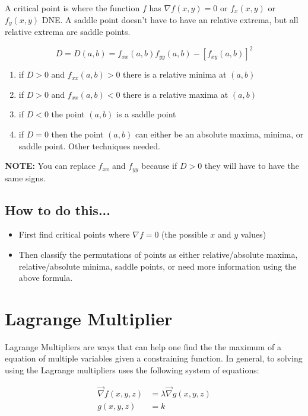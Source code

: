 \documentclass{article}
\begin{document}
A critical point is where the function $f$ has $\nabla f(x,y) = 0$ or $f_x(x, y)$ or $f_y(x, y)$ DNE. A saddle point doesn't have to have an relative extrema, but all relative extrema are saddle points.

$$D = D(a, b) = f_{xx}(a, b)f_{yy}(a,b) - \left[f_{xy}(a, b)\right]^2$$

\begin{enumerate}
    \item if $D > 0$ and $f_{xx}(a,b) > 0$ there is a relative minima at $(a,b)$
    \item if $D > 0$ and $f_{xx}(a,b) < 0$ there is a relative maxima at $(a,b)$
    \item if $D < 0$ the point $(a,b)$ is a saddle point
    \item if $D = 0$ then the point $(a,b)$ can either be an absolute maxima, minima, or saddle point. Other techniques needed.
\end{enumerate}

\textbf{NOTE:} You can replace $f_{xx}$ and $f_{yy}$ because if $D > 0$ they will have to have the same signs.

\subsection{How to do this...}

\begin{itemize}
    \item First find critical points where $\nabla f = 0$ (the possible $x$ and $y$ values)
    \item Then classify the permutations of points as either relative/absolute maxima, relative/absolute minima, saddle points, or need more information using the above formula.
\end{itemize}

\section{Lagrange Multiplier}

Lagrange Multipliers are ways that can help one find the the maximum of a equation of multiple variables given a constraining function. In general, to solving using the Lagrange multipliers uses the following system of equations:

\begin{align*}
    \vec{\nabla} f(x, y, z) & = \lambda \vec{\nabla} g(x, y, z) \\
    g(x, y, z)              & = k
\end{align*}
\end{document}

